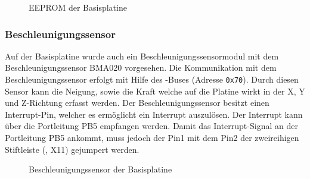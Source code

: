 \begin{figure}[htb]
    \centering
    \qquad
    \qquad
    \caption[EEPROM der Basisplatine]{EEPROM der \gls{Basisplatine}}
    \label{fig:basisplatine-eeprom}
\end{figure}

\subsubsection{Beschleunigungssensor}
Auf der \gls{Basisplatine} wurde auch ein Beschleunigungssensormodul mit dem Beschleunigungssensor BMA020 vorgesehen. Die Kommunikation mit dem Beschleunigungssensor erfolgt mit Hilfe des \IIC{}-Buses (Adresse \texttt{0x70}). Durch diesen Sensor kann die Neigung, sowie die Kraft welche auf die Platine wirkt in der X, Y und Z-Richtung erfasst werden. Der Beschleunigungssensor besitzt einen Interrupt-Pin, welcher es ermöglicht ein Interrupt auszulösen. Der Interrupt kann über die Portleitung PB5 empfangen werden. Damit das Interrupt-Signal an der Portleitung PB5 ankommt, muss jedoch der Pin1 mit dem Pin2 der zweireihigen Stiftleiste (, X11) gejumpert werden.

\begin{figure}[htb]
    \centering
    \qquad
    \qquad
    \caption[Beschleunigungssensor der Basisplatine]{Beschleunigungssensor der \gls{Basisplatine}}
    \label{fig:basisplatine-bma}
\end{figure}

